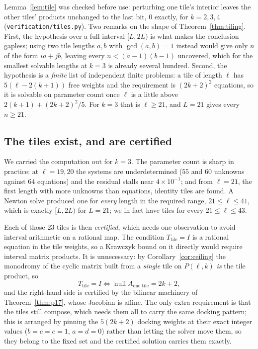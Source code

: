 \documentclass[11pt]{article}
\theoremstyle{definition}
\begin{document}
\noindent
Lemma~\ref{lem:tile} was checked before use: perturbing one tile's interior
leaves the other tiles' products unchanged to the last bit, $0$ exactly, for
$k=2,3,4$ (\texttt{verification/tiles.py}). Two remarks on the shape of
Theorem~\ref{thm:tiling}. First, the hypothesis over a full interval $[L,2L)$ is
what makes the conclusion gapless; using two tile lengths $a,b$ with
$\gcd(a,b)=1$ instead would give only $n$ of the form $ia+jb$, leaving every
$n<(a-1)(b-1)$ uncovered, which for the smallest solvable lengths at $k=3$ is
already several hundred. Second, the hypothesis is a \emph{finite} list of
independent finite problems: a tile of length $\ell$ has $5(\ell-2(k+1))$ free
weights and the requirement is $(2k+2)^2$ equations, so it is solvable on
parameter count once $\ell$ is a little above $2(k+1)+(2k+2)^2/5$. For $k=3$
that is $\ell\ge21$, and $L=21$ gives every $n\ge21$.

\subsection*{The tiles exist, and are certified}
We carried the computation out for $k=3$. The parameter count is sharp in
practice: at $\ell=19,20$ the systems are underdetermined ($55$ and $60$
unknowns against $64$ equations) and the residual stalls near $4\times10^{-1}$;
and from $\ell=21$, the first length with more unknowns than equations,
identity tiles are found. A Newton
solve produced one for \emph{every} length in the required range,
$21\le\ell\le41$, which is exactly $[L,2L)$ for $L=21$; we in fact have tiles
for every $21\le\ell\le43$.

Each of those $23$ tiles is then \emph{certified}, which needs one observation to
avoid interval arithmetic on a rational map. The condition
$T_{\text{tile}}=I$ is a rational equation in the tile weights, so a Krawczyk
bound on it directly would require interval matrix products. It is unnecessary:
by Corollary~\ref{cor:ceiling} the monodromy of the cyclic matrix built from a
\emph{single} tile on $P(\ell,k)$ \emph{is} the tile product, so
\[
  T_{\text{tile}}=I
  \iff
  \operatorname{null}A_{\text{one tile}}=2k+2 ,
\]
and the right-hand side is certified by the bilinear machinery of
Theorem~\ref{thm:p17}, whose Jacobian is affine. The only extra requirement is
that the tiles still compose, which needs them all to carry the same docking
pattern; this is arranged by pinning the $5(2k+2)$ docking weights at their exact
integer values ($b=c=e=1$, $a=d=0$) rather than letting the solver move them, so
they belong to the fixed set and the certified solution carries them exactly.
\end{document}

